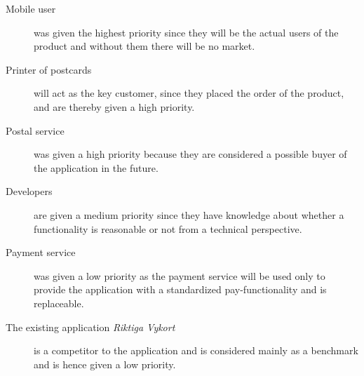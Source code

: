 \documentclass[10pt,a4paper]{article}
\begin{document}
\begin{description}
\item[Mobile user] was given the highest priority since they will be the actual users of the product and without them there will be no market.
\item[Printer of postcards] will act as the key customer, since they placed the order of the product, and are thereby given a high priority. 
\item[Postal service] was given a high priority because they are considered a possible buyer of the application in the future. 
\item[Developers] are given a medium priority since they have knowledge about whether a functionality is reasonable or not from a technical perspective.
\item[Payment service] was given a low priority as the payment service will be used only to provide the application with a standardized pay-functionality and is replaceable.
\item[The existing application \textit{Riktiga Vykort}]  is a competitor to the application and is considered mainly as a benchmark and is hence given a low priority. 

\end{description}
\end{document}
